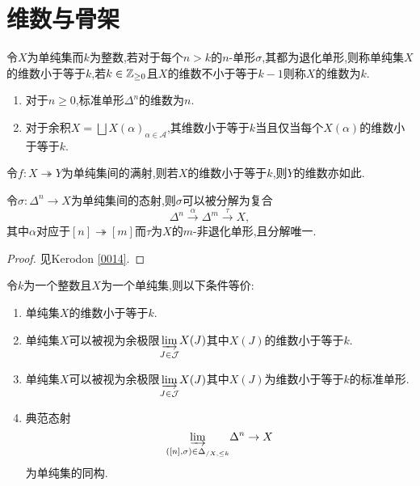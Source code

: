 \section{维数与骨架}
\begin{definition}[单纯集的维数]
    令$X$为单纯集而$k$为整数,若对于每个$n>k$的$n$-单形$\sigma$,其都为退化单形,则称单纯集$X$的维数小于等于$k$,若$k \in \mathbb{Z}_{\geq 0}$且$X$的维数不小于等于$k-1$则称$X$的维数为$k$.
\end{definition}
\begin{example}
    \begin{enumerate}
        \item 对于$n \geq 0$,标准单形$\Delta^n$的维数为$n$.
        \item 对于余积$X= \bigsqcup X(\alpha)_{\alpha \in \mathcal{A}}$,其维数小于等于$k$当且仅当每个$X(\alpha)$的维数小于等于$k$.
    \end{enumerate}    
\end{example}
\begin{remark}
    令$f : X \twoheadrightarrow Y$为单纯集间的满射,则若$X$的维数小于等于$k$,则$Y$的维数亦如此.
\end{remark}
\begin{proposition}\label{Pro:满态射分解}
    令$\sigma :\Delta^n \to X$为单纯集间的态射,则$\sigma$可以被分解为复合
    \[
    \Delta^n \xrightarrow{\alpha}\Delta^m \xrightarrow{\tau} X,
    \]
    其中$\alpha$对应于$[n] \twoheadrightarrow [m]$而$\tau$为$X$的$m$-非退化单形,且分解唯一.
\end{proposition}
\begin{proof}
    见Kerodon \href{https://kerodon.net/tag/0014}{[0014]}.
\end{proof}
\begin{theorem}\label{The:单纯集的维数}
    令$k$为一个整数且$X$为一个单纯集,则以下条件等价:
    \begin{enumerate}
        \item 单纯集$X$的维数小于等于$k$.
        \item 单纯集$X$可以被视为余极限$\underset{J\in \mathcal{J}}{\underrightarrow{\lim}} X(J)$其中$X(J)$的维数小于等于$k$.
        \item 单纯集$X$可以被视为余极限$\underset{J\in \mathcal{J}}{\underrightarrow{\lim}} X(J)$其中$X(J)$为维数小于等于$k$的标准单形.
        \item 典范态射
        \[
        \underset{([n],\sigma)\in \Delta_{/X,\leq k}}{\underrightarrow{\lim}}\Delta^n \to X
        \]
        为单纯集的同构.
    \end{enumerate}
\end{theorem}
